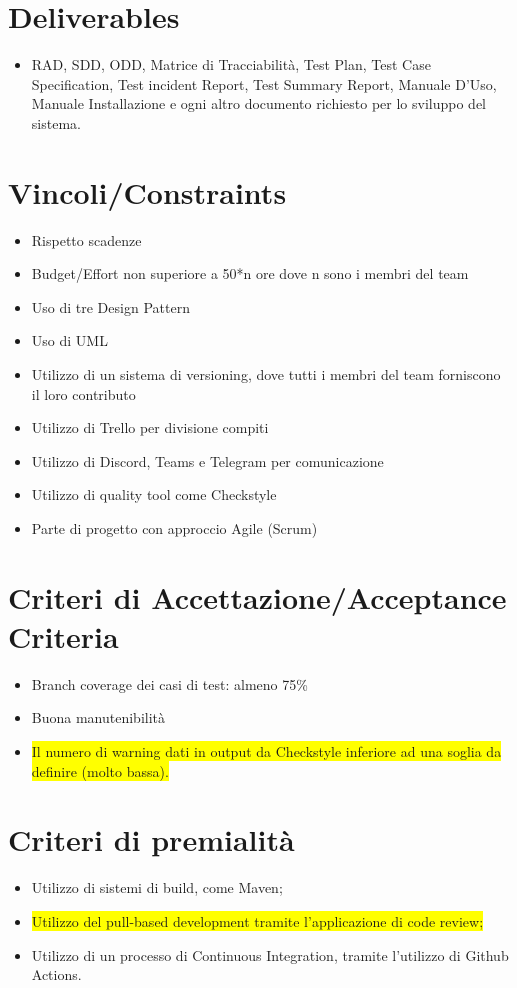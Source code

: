 \documentclass[12pt]{article}
\begin{document}
  \section{Deliverables}
  \begin{itemize}
      \item RAD, SDD, ODD, Matrice di Tracciabilità, Test Plan, Test Case Specification, Test incident Report, Test Summary Report, Manuale D’Uso, Manuale Installazione e ogni altro documento richiesto per lo sviluppo del sistema.
  \end{itemize}
  
  \section{Vincoli/Constraints}
  \begin{itemize}
  \item Rispetto scadenze
  \item Budget/Effort non superiore a 50*n ore dove n sono i membri del team 
  \item Uso di tre Design Pattern
  \item Uso di UML
  \item Utilizzo di un sistema di versioning, dove tutti i membri del team forniscono il loro contributo
  \item Utilizzo di Trello per divisione compiti
  \item Utilizzo di Discord, Teams e Telegram per comunicazione
  \item Utilizzo di quality tool come Checkstyle
  \item Parte di progetto con approccio Agile (Scrum)
  \end{itemize}
  
  \section{Criteri di Accettazione/Acceptance Criteria}
  \begin{itemize}
      \item Branch coverage dei casi di test: almeno 75\%
      \item Buona manutenibilità
      \item \colorbox{yellow}{Il numero di warning dati in output da Checkstyle inferiore ad una soglia da definire (molto bassa).}
  \end{itemize}
  
  \section{Criteri di premialità}
  
  \begin{itemize}
      \item Utilizzo di sistemi di build, come Maven;
      \item \colorbox{yellow}{Utilizzo del pull-based development tramite l’applicazione di code review;}
      \item Utilizzo di un processo di Continuous Integration, tramite l’utilizzo di Github Actions.
  \end{itemize}
\end{document}
